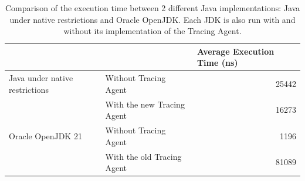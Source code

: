 \begin{table}[]
\centering
\begin{tabular}{@{}llr@{}}
\toprule
                               &                       & \multicolumn{1}{l}{Average Execution Time (ns)} \\ \midrule
Java under native restrictions & Without Tracing Agent & 25442                                           \\
                               & With the new Tracing Agent    & 16273                                           \\ \midrule
Oracle OpenJDK 21              & Without Tracing Agent & 1196                                            \\
                               & With the old Tracing Agent    & 81089                                           \\ \bottomrule
\end{tabular}
\caption{Comparison of the execution time between 2 different Java implementations: Java under native restrictions and Oracle OpenJDK. Each JDK is also run with and without its implementation of the Tracing Agent.}
\label{tab:benchmark_1}
\end{table}


